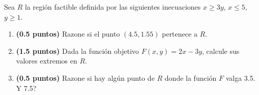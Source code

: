 
Sea $R$ la región factible definida por las siguientes inecuaciones $x\geq3y$, $x\leq5$, $y\geq1$.
\begin{enumerate}[label=\alph*)]
\item \textbf{(0.5 puntos)} Razone si el punto $(4.5,1.55)$ pertenece a $R$.
\item \textbf{(1.5 puntos)} Dada la función objetivo $F(x,y)=2x-3y$, calcule sus valores extremos en $R$.
\item \textbf{(0.5 puntos)} Razone si hay algún punto de $R$ donde la función $F$ valga 3.5. \textquestiondown{}Y 7.5?
\end{enumerate}
